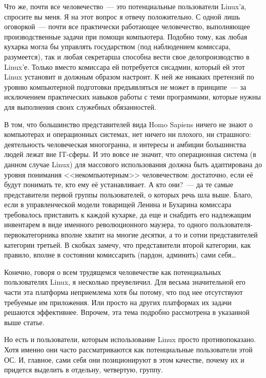 Что же, почти все человечество~--- это потенциальные пользователи Linux'а, спросите вы меня. Я на этот вопрос я отвечу положительно. С одной лишь оговоркой~--- почти все практически работающее человечество, выполняющее производственные задачи при помощи компьютера. Подобно тому, как любая кухарка могла бы управлять государством (под наблюдением комиссара, разумеется), так и любая секретарша способна вести свое делопроизводство в Linux'е. Только вместо комиссара ей потребуется сисадмин, который ей этот Linux установит и должным образом настроит. К ней же никаких претензий по уровню компьютерной подготовки предъявляться не может в принципе~--- за исключением практических навыков работы с теми программами, которые нужны для выполнения своих служебных обязанностей.

В том, что большинство представителей вида Homo Sapiens ничего не знают о компьютерах и операционных системах, нет ничего ни плохого, ни страшного: деятельность человеческая многогранна, и интересы и амбиции большинства людей лежат вне IT-сферы. И это вовсе не значит, что операционная система (в данном случае Linux) для массового использования должна быть адаптирована до уровня понимания <<некомпьютерным>> человечеством: достаточно, если её будут понимать те, кто ему её устанавливает. А кто они?~--- да те самые представители первой группы пользователей, о которых речь шла выше. Благо, если в управленческой модели товарищей Ленина и Бухарина комиссара требовалось приставить к каждой кухарке, да еще и снабдить его надлежащим инвентарем в виде именного революционного маузера, то одного пользователя-первокатегорника вполне хватит на многие десятки, а то и сотни представителей категории третьей. В скобках замечу, что представители второй категории, как правило, вполне в состоянии комиссарить (пардон, админить) сами себя\dots

Конечно, говоря о всем трудящемся человечестве как потенциальных пользователях Linux, я несколько преувеличил. Для весьма значительной его части эта платформа неприемлема хотя бы потому, что под нее отсутствуют требуемые им приложения. Или просто на других платформах их задачи решаются эффективнее. Впрочем, эта тема подробно рассмотрена в указанной выше статье. 

Но есть и пользователи, которым использование Linux просто противопоказано. Хотя именно они часто рассматриваются как потенциальные пользователи этой ОС. И, главное, сами себя они позиционируют в этом качестве, почему их и придется выделить в отдельну, четвертую, группу.

